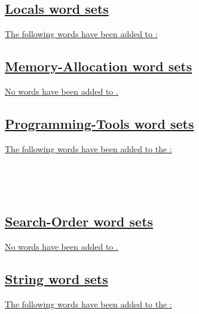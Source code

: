 \subsection[{Locals word sets}]{\uline{Locals word sets}}
\uline{The following words have been added to :}

\uline{}

\subsection[{Memory-Allocation word sets}]{\uline{Memory-Allocation word sets}}
\uline{No words have been added to .}

\subsection[{Programming-Tools word sets}]{\uline{Programming-Tools word sets}}
\uline{The following words have been added to the :}

\begin{minipage}[t]{0.3\linewidth}
\uline{} \\
\uline{}
\end{minipage}
\hfill
\begin{minipage}[t]{0.3\linewidth}
\uline{} \\
\uline{}
\end{minipage}
\hfill
\begin{minipage}[t]{0.3\linewidth}
\uline{}
\end{minipage}

\subsection[{Search-Order word sets}]{\uline{Search-Order word sets}}
\uline{No words have been added to .}

\subsection[{String word sets}]{\uline{String word sets}}
\uline{The following words have been added to the :}

\begin{minipage}[t]{0.3\linewidth}
\uline{}
\end{minipage}
\hfill
\begin{minipage}[t]{0.3\linewidth}
\uline{}
\end{minipage}
\hfill
\begin{minipage}[t]{0.3\linewidth}
\uline{}
\end{minipage}

